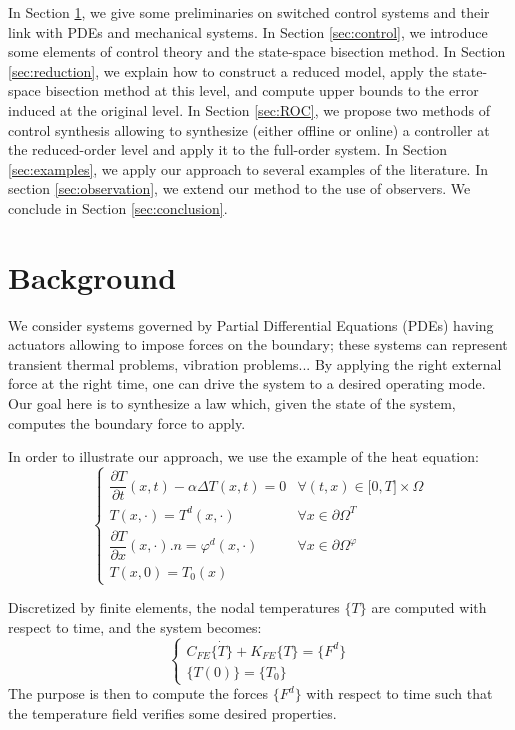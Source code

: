 In Section \ref{sec:background_part5}, we give some preliminaries
on switched control systems and their link with PDEs and mechanical systems.
In Section \ref{sec:control}, we introduce some elements of control theory and 
the state-space bisection method.
In Section \ref{sec:reduction}, we explain how to construct
a reduced model, apply the state-space bisection method at this level, and compute
upper bounds to the error induced at the original level.
In Section \ref{sec:ROC}, we propose two methods of control synthesis
allowing to synthesize (either offline or online) a controller at the reduced-order level and apply it
to the full-order system.
In Section \ref{sec:examples}, we apply our approach to several examples of
the literature.
In section \ref{sec:observation}, we extend our method to the use of observers.
We conclude in Section \ref{sec:conclusion}.


\section{Background}\label{sec:background_part5}

We consider systems governed by Partial Differential Equations (PDEs) having actuators 
allowing to impose forces on the boundary; these systems can represent transient 
thermal problems, vibration problems...
By applying the right external force at the right time,
one can drive the system to a desired operating mode. Our goal here is 
to synthesize a law which, given the state of the system, computes the boundary force to apply.

In order to illustrate our approach, we use the example of the
heat equation:
\begin{equation} \left\lbrace
\begin{array}{ll}
  \dfrac{\partial T}{\partial t}(x,t) - \alpha \Delta T(x,t) = 0 & \forall (t,x) \in \lbrack 0,T \rbrack \times \Omega \\
  T(x,\cdot) = T^d(x,\cdot) & \forall x \in \partial \Omega^T \\
  \dfrac{\partial T}{\partial x}(x,\cdot) .n = \varphi^d(x,\cdot) & \forall x \in \partial\Omega^\varphi \\
  T(x,0) = T_0(x)
\end{array} \right.
\label{eq:heat_eq}
\end{equation}

Discretized by finite elements, the nodal temperatures $\{ T \}$ are computed
with respect to time, and the system becomes:
\begin{equation} \left \lbrace
\begin{array}{l}
 C_{FE} \dot{ \{ T \} } + K_{FE} \{ T \} = \{ F^d \} \\
\{ T(0) \} = \{ T_0 \}
 \end{array} \right.
 \label{eq:heat_eq_ef}
\end{equation}
The purpose is then to compute the forces $\{ F^d \}$ with respect to time such that
the temperature field verifies some desired properties.

